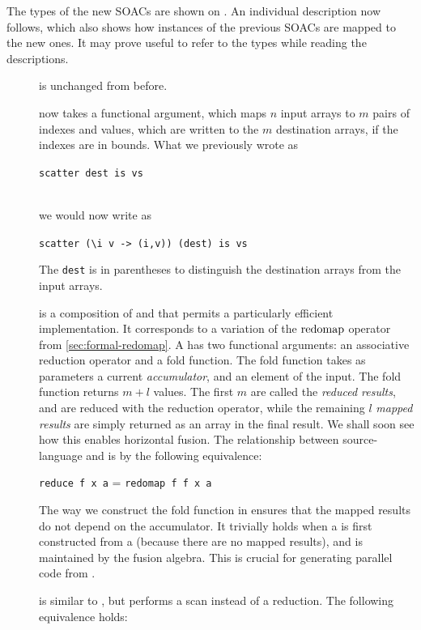 The types of the new SOACs are shown on .  An
individual description now follows, which also shows how instances of
the previous SOACs are mapped to the new ones.  It may prove useful to
refer to the types while reading the descriptions.

\begin{description}
\item[{}] is unchanged from before.
\item[{}] now takes a functional argument, which maps $n$
  input arrays to $m$ pairs of indexes and values, which are written
  to the $m$ destination arrays, if the indexes are in bounds.
  What we previously wrote as\\
  \centerline{\lstinline{scatter dest is vs}}\\
  we would now write as\\
  \centerline{\lstinline{scatter (\i v -> (i,v)) (dest) is vs}} The
  \lstinline{dest} is in parentheses to distinguish the destination
  arrays from the input arrays.
\item[] is a composition of  and  that
  permits a particularly efficient implementation.  It corresponds to
  a variation of the $\mathrm{redomap}$ operator from
  \cref{sec:formal-redomap}.  A  has two functional
  arguments: an associative reduction operator and a fold function.
  The fold function takes as parameters a current
  \textit{accumulator}, and an element of the input.  The 
  fold function returns $m+l$ values.  The first $m$ are called the
  \textit{reduced results}, and are reduced with the reduction
  operator, while the remaining $l$ \textit{mapped results} are simply
  returned as an array in the final result.  We shall soon see how
  this enables horizontal fusion.  The relationship between
  source-language  and  is by the
  following equivalence:\\
  \centerline{\lstinline{reduce f x a} = \lstinline{redomap f f x a}}
  The way we construct the fold function in  ensures that
  the mapped results do not depend on the accumulator.  It trivially
  holds when a  is first constructed from a 
  (because there are no mapped results), and is maintained by the
  fusion algebra.  This is crucial for generating parallel code from
  .
\item[] is similar to , but performs a scan
  instead of a reduction.  The following equivalence holds:\\

\end{description}
